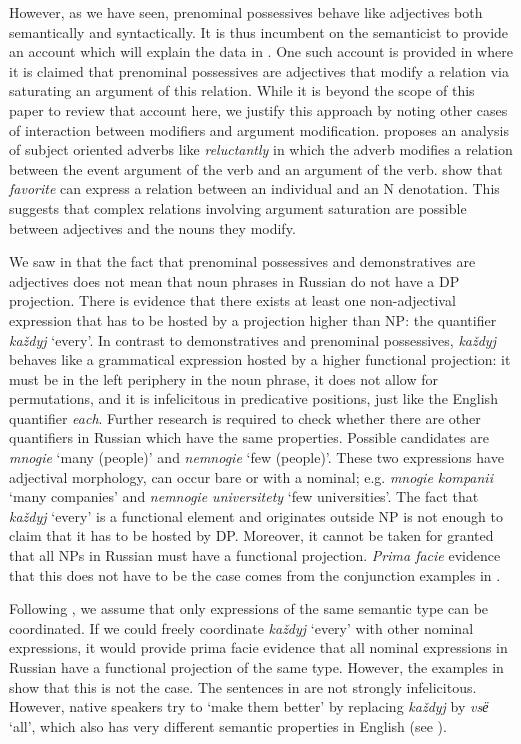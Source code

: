 \documentclass[output=paper]{langscibook}
\begin{document}
However, as we have seen, prenominal possessives behave like adjectives both semantically and syntactically. It is thus incumbent on the semanticist to provide an account which will explain the data in . One such account is provided in \citet{Gepner2021a} where it is claimed that prenominal possessives are adjectives that modify a relation via saturating an argument of this relation. While it is beyond the scope of this paper to review that account here, we justify this approach by noting other cases of interaction between modifiers and argument modification. \citet{Landman2000} proposes an analysis of subject oriented adverbs like \textit{reluctantly} in which the adverb modifies a relation between the event argument of the verb and an argument of the verb. \citet{Partee.Borschev1999} show that \textit{favorite} can express a relation between an individual and an N denotation. This suggests that complex relations involving argument saturation are possible between adjectives and the nouns they modify.

We saw in  that the fact that prenominal possessives and demonstratives are adjectives does not mean that noun phrases in Russian do not have a DP projection. There is evidence that there exists at least one non-adjectival expression that has to be hosted by a projection higher than NP: the quantifier \textit{každyj} `every'. In contrast to demonstratives and prenominal possessives, \textit{každyj} behaves like a grammatical expression hosted by a higher functional projection: it must be in the left periphery in the noun phrase, it does not allow for permutations, and it is infelicitous in predicative positions, just like the English quantifier \textit{each}. Further research is required to check whether there are other quantifiers in Russian which have the same properties. Possible candidates are \textit{mnogie} `many (people)' and \textit{nemnogie} `few (people)'. These two expressions have adjectival morphology, can occur bare or with a nominal; e.g. \textit{mnogie kompanii} `many companies' and \textit{nemnogie universitety} `few universities'. 
The fact that \textit{každyj} `every' is a functional element and originates outside NP is not enough to claim that it has to be hosted by DP. Moreover, it cannot be taken for granted that all NPs in Russian must have a functional projection. \textit{Prima facie} evidence that this does not have to be the case comes from the conjunction examples in . 

Following \citet{Partee1987}, we assume that only expressions of the same semantic type can be coordinated. If we could freely coordinate \textit{každyj} `every' with other nominal expressions, it would provide prima facie evidence that all nominal expressions in Russian have a functional projection of the same type. However, the examples in  show that this is not the case. The sentences in  are not strongly infelicitous. However, native speakers try to `make them better' by replacing \textit{každyj} by \textit{vsё} `all', which also has very different semantic properties in English (see \citealt{Dowty1987, Dowty.Brody1984}).
\end{document}
